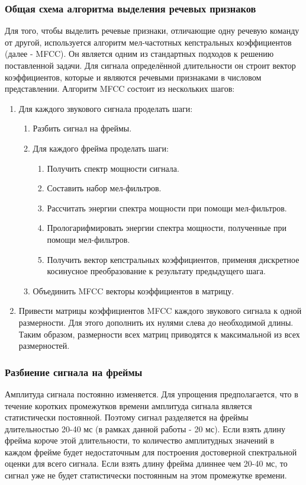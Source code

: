 \subsubsection{Общая схема алгоритма выделения речевых признаков}
Для того, чтобы выделить речевые признаки, отличающие одну речевую команду от другой, используется алгоритм мел-частотных кепстральных коэффициентов \cite{MFCC} (далее - MFCC). Он является одним из стандартных подходов к решению поставленной задачи. Для сигнала определённой длительности он строит вектор коэффициентов, которые и являются речевыми признаками в числовом представлении. Алгоритм MFCC состоит из нескольких шагов:
\begin{enumerate}
	\item Для каждого звукового сигнала проделать шаги:
	\begin{enumerate}
		\item Разбить сигнал на фреймы.
		\item Для каждого фрейма проделать шаги:
		\begin{enumerate}
			\item Получить спектр мощности сигнала.
			\item Составить набор мел-фильтров.
			\item Рассчитать энергии спектра мощности при помощи  мел-фильтров.
			\item Прологарифмировать энергии спектра мощности, полученные при помощи мел-фильтров.
			\item Получить вектор кепстральных коэффициентов, применяя дискретное косинусное преобразование к результату предыдущего шага.
		\end{enumerate}
		\item Объединить MFCC векторы коэффициентов в матрицу.
	\end{enumerate}

	\item Привести матрицы коэффициентов MFCC каждого звукового сигнала к одной размерности. Для этого дополнить их нулями слева до необходимой длины. Таким образом, размерности всех матриц приводятся к максимальной из всех размерностей.
\end{enumerate}

\subsubsection{Разбиение сигнала на фреймы}
Амплитуда сигнала постоянно изменяется. Для упрощения предполагается, что в течение коротких промежутков времени амплитуда сигнала является статистически постоянной. Поэтому сигнал разделяется на фреймы длительностью 20-40 мс (в рамках данной работы - 20 мс). Если взять длину фрейма короче этой длительности, то количество амплитудных значений в каждом фрейме будет недостаточным для построения достоверной спектральной оценки для всего сигнала. Если взять длину фрейма длиннее чем 20-40 мс, то сигнал уже не будет статистически постоянным на этом промежутке времени.

